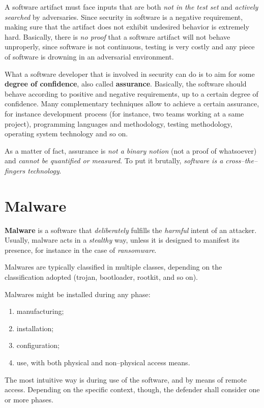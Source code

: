 \documentclass[10pt]{extbook}
\begin{document}
A software artifact must face inputs that are both \emph{not in the test set}
and \emph{actively searched} by adversaries. Since security in software is a
negative requirement, making sure that the artifact does not exhibit undesired
behavior is extremely hard. Basically, there is \emph{no proof} that a software
artifact will not behave unproperly, since software is not continuous, testing
is very costly and any piece of software is drowning in an adversarial
environment.

What a software developer that is involved in security can do is to aim for
some \textbf{degree of confidence}, also called \textbf{assurance}. Basically,
the software should behave according to positive and negative requirements, up
to a certain degree of confidence. Many complementary techniques allow to
achieve a certain assurance, for instance development process (for instance,
two teams working at a same project), programming languages and methodology,
testing methodology, operating system technology and so on.

As a matter of fact, assurance is \emph{not a binary notion} (not a proof of
whatsoever) and \emph{cannot be quantified or measured}. To put it brutally,
\emph{software is a cross--the--fingers technology}.

\section{Malware}

\textbf{Malware} is a software that \emph{deliberately} fulfills the
\emph{harmful} intent of an attacker. Usually, malware acts in a
\emph{stealthy} way, unless it is designed to manifest its presence, for
instance in the case of \emph{ransomware}.

Malwares are typically classified in multiple classes, depending on the
classification adopted (trojan, bootloader, rootkit, and so on).

Malwares might be installed during any phase:
\begin{enumerate}
    \item manufacturing;
    \item installation;
    \item configuration;
    \item use, with both physical and non--physical access means.
\end{enumerate}

The most intuitive way is during use of the software, and by means of remote
access. Depending on the specific context, though, the defender shall consider
one or more phases.
\end{document}
